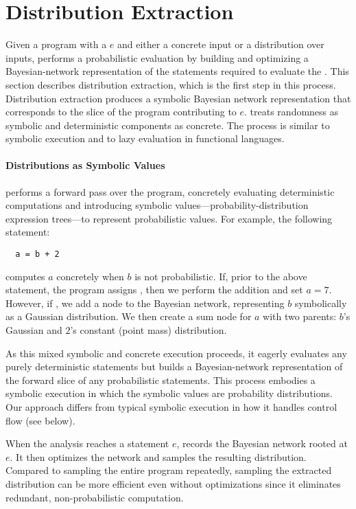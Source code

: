 \section{Distribution Extraction} 
\label{sec:distex}


Given a program with a \passert $e$ and either a concrete input or a
distribution over inputs,
\tool performs a probabilistic evaluation
by building and optimizing a Bayesian-network representation of the statements
required to evaluate the \passert.  This section describes
distribution extraction, which is the first step in this process.
Distribution extraction produces a symbolic Bayesian network representation
that corresponds to the slice of the program contributing to $e$.
\tool treats randomness as symbolic and
deterministic components as concrete.
The process is similar to symbolic execution and to lazy evaluation in
functional languages.

\paragraph{Distributions as Symbolic Values}
\mayhap performs a forward pass over the program, concretely
evaluating deterministic computations and introducing symbolic
values---probability-distribution expression trees---to represent
probabilistic values. For example, the following statement: 
%
\begin{lstlisting}
  a = b + 2
\end{lstlisting}
%
computes $a$ concretely when $b$ is not probabilistic.  If, prior to the above
statement, the program assigns , then we perform the
addition and set $a=7$.  However, if , we
add a node to the Bayesian network, representing $b$
symbolically as a Gaussian distribution.  We then create a sum node for
$a$ with two parents: $b$'s Gaussian  and $2$'s constant (point mass) distribution.

As this mixed symbolic and concrete execution proceeds, it eagerly
evaluates any purely deterministic statements but builds a Bayesian-network
representation
of the forward slice of any probabilistic statements.  This
process embodies a symbolic execution in which the symbolic values are
probability distributions. Our approach differs from typical symbolic
execution
in how it handles control flow (see below).  

When the analysis reaches a statement \passert $e$, \mayhap records the Bayesian network
rooted at $e$. It then optimizes the network and samples the
resulting distribution.
Compared to sampling the entire program repeatedly, sampling the extracted
distribution can be more efficient even without optimizations since it
eliminates redundant, non-probabilistic
computation. 

